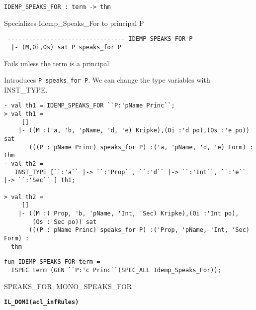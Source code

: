 \begin{verbatim}
IDEMP_SPEAKS_FOR : term -> thm
\end{verbatim}

\SYNOPSIS
Specializes Idemp_Speaks_For to principal P

\DESCRIBE

\begin{verbatim}
 --------------------------------- IDEMP_SPEAKS_FOR P
  |- (M,Oi,Os) sat P speaks_for P
\end{verbatim}

\FAILURE
Fails unless the term is a principal

\EXAMPLE
Introduces \texttt{P speaks\_for P}. We can change the type variables with INST_TYPE.
\begin{holboxed}
  \begin{scriptsize}
\begin{verbatim}
- val th1 = IDEMP_SPEAKS_FOR ``P:'pName Princ``;
> val th1 =
     []
    |- ((M :('a, 'b, 'pName, 'd, 'e) Kripke),(Oi :'d po),(Os :'e po)) sat
       (((P :'pName Princ) speaks_for P) :('a, 'pName, 'd, 'e) Form) : thm
- val th2 = 
   INST_TYPE [``:'a`` |-> ``:'Prop``, ``:'d`` |-> ``:'Int``, ``:'e`` |-> ``:'Sec`` ] th1;

> val th2 =
     []
    |- ((M :('Prop, 'b, 'pName, 'Int, 'Sec) Kripke),(Oi :'Int po),
        (Os :'Sec po)) sat
       (((P :'pName Princ) speaks_for P) :('Prop, 'pName, 'Int, 'Sec) Form) :
  thm
\end{verbatim}
  \end{scriptsize}
\end{holboxed}

\IMPLEMENTATION
\begin{holboxed}
\begin{verbatim}
fun IDEMP_SPEAKS_FOR term = 
  ISPEC term (GEN ``P:'c Princ``(SPEC_ALL Idemp_Speaks_For));
\end{verbatim}
\end{holboxed}

\SEEALSO
SPEAKS\_FOR, MONO\_SPEAKS\_FOR

\ENDDOC


\begin{holboxed}
  \begin{Large}
    \textbf{\texttt{IL\_DOMI}}\hfill{}\textbf{\texttt{(acl\_infRules)}}
  \end{Large}
\end{holboxed}

